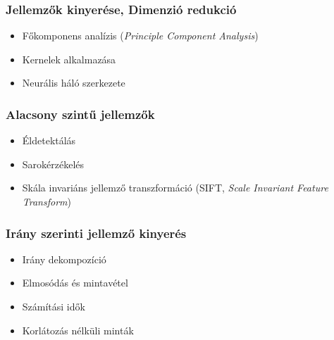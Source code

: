 \documentclass{beamer}
\begin{document}
\begin{frame}[fragile]
\frametitle{Jellemzők kinyerése, Dimenzió redukció}

\begin{itemize}
\item Főkomponens analízis (\textit{Principle Component Analysis})
\item Kernelek alkalmazása
\item Neurális háló szerkezete
\end{itemize}

\end{frame}

\begin{frame}[fragile]
\frametitle{Alacsony szintű jellemzők}

\begin{itemize}
\item Éldetektálás
\item Sarokérzékelés
\item Skála invariáns jellemző transzformáció (SIFT, \textit{Scale Invariant Feature Transform})
\end{itemize}

\end{frame}

\begin{frame}[fragile]
\frametitle{Irány szerinti jellemző kinyerés}

\begin{itemize}
\item Irány dekompozíció
\item Elmosódás és mintavétel
\item Számítási idők
\item Korlátozás nélküli minták
\end{itemize}

\end{frame}
\end{document}
